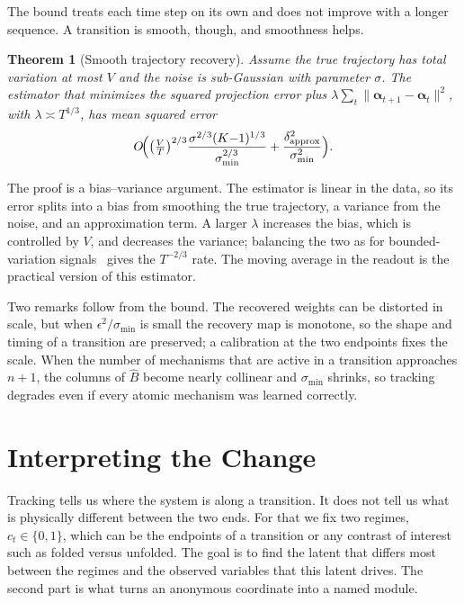 \documentclass[10pt,twocolumn,letterpaper]{article}
\newcommand{\valpha}{\boldsymbol{\alpha}}
\newtheorem{theorem}{Theorem}
\theoremstyle{definition}
\begin{document}
The bound treats each time step on its own and does not improve with a longer sequence.
A transition is smooth, though, and smoothness helps.

\begin{theorem}[Smooth trajectory recovery]
\label{thm:smooth}
Assume the true trajectory has total variation at most $V$ and the noise is sub-Gaussian with parameter $\sigma$.
The estimator that minimizes the squared projection error plus $\lambda\sum_t\|\valpha_{t+1}-\valpha_t\|^2$, with $\lambda\asymp T^{1/3}$, has mean squared error
\begin{equation}
O\!\Bigl(\bigl(\tfrac{V}{T}\bigr)^{2/3}\frac{\sigma^{2/3}(K{-}1)^{1/3}}{\sigma_{\min}^{2/3}}+\frac{\delta_{\mathrm{approx}}^2}{\sigma_{\min}^2}\Bigr).
\end{equation}
\end{theorem}

The proof is a bias--variance argument.
The estimator is linear in the data, so its error splits into a bias from smoothing the true trajectory, a variance from the noise, and an approximation term.
A larger $\lambda$ increases the bias, which is controlled by $V$, and decreases the variance; balancing the two as for bounded-variation signals~\cite{tibshirani2014adaptive} gives the $T^{-2/3}$ rate.
The moving average in the readout is the practical version of this estimator.

Two remarks follow from the bound.
The recovered weights can be distorted in scale, but when $\epsilon^2/\sigma_{\min}$ is small the recovery map is monotone, so the shape and timing of a transition are preserved; a calibration at the two endpoints fixes the scale.
When the number of mechanisms that are active in a transition approaches $n+1$, the columns of $\hat B$ become nearly collinear and $\sigma_{\min}$ shrinks, so tracking degrades even if every atomic mechanism was learned correctly.

\section{Interpreting the Change}
\label{sec:interp}

Tracking tells us where the system is along a transition.
It does not tell us what is physically different between the two ends.
For that we fix two regimes, $c_t\in\{0,1\}$, which can be the endpoints of a transition or any contrast of interest such as folded versus unfolded.
The goal is to find the latent that differs most between the regimes and the observed variables that this latent drives.
The second part is what turns an anonymous coordinate into a named module.
\end{document}
